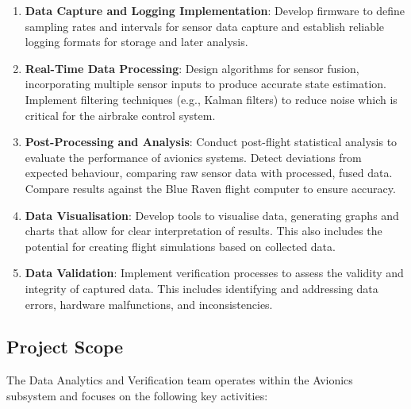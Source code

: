 \begin{enumerate}
    \item \textbf{Data Capture and Logging Implementation}: Develop firmware to define sampling rates and intervals for sensor data capture and establish reliable logging formats for storage and later analysis.
    \item \textbf{Real-Time Data Processing}: Design algorithms for sensor fusion, incorporating multiple sensor inputs to produce accurate state estimation. Implement filtering techniques (e.g., Kalman filters) to reduce noise which is critical for the airbrake control system.
    \item \textbf{Post-Processing and Analysis}: Conduct post-flight statistical analysis to evaluate the performance of avionics systems. Detect deviations from expected behaviour, comparing raw sensor data with processed, fused data. Compare results against the Blue Raven flight computer to ensure accuracy.
    \item \textbf{Data Visualisation}: Develop tools to visualise data, generating graphs and charts that allow for clear interpretation of results. This also includes the potential for creating flight simulations based on collected data.
    \item \textbf{Data Validation}: Implement verification processes to assess the validity and integrity of captured data. This includes identifying and addressing data errors, hardware malfunctions, and inconsistencies.
\end{enumerate}

\subsection{Project Scope}
The Data Analytics and Verification team operates within the Avionics subsystem and focuses on the following key activities:

